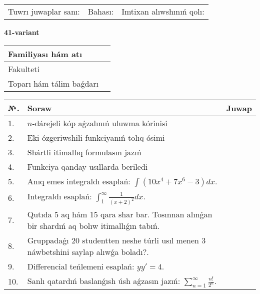 \documentclass{article}
\begin{document}
\vspace{1cm}

\begin{tabular}{ c c c }
Tuwrı juwaplar sanı: \underline{\hspace{2cm}} & Bahası: \underline{\hspace{2cm}} & Imtixan alıwshınıń qolı: \underline{\hspace{2cm}} \\
\end{tabular}

\newpage

\begin{center}\textbf{41-variant}\end{center}

\bgroup
\def\arraystretch{1.5}
\begin{tabular}{ |m{6cm}|m{10cm}| }
  \hline
  Familiyası hám atı & \\
  \hline
  Fakulteti &\\
  \hline
  Toparı hám tálim baǵdarı & \\
  \hline
\end{tabular}
\egroup

\vspace{0.5cm}

\bgroup
\def\arraystretch{2}
\begin{tabular}{ |l|m{8cm}|m{7cm}| }
  \hline
  №. & Soraw & Juwap \\
  \hline
  1. & $n$-dárejeli kóp aǵzalınıń uluwma kórinisi &  \\
  \hline
  2. & Eki ózgeriwshili funkciyanıń tolıq ósimi &  \\
  \hline
  3. & Shártli itimallıq formulasın jazıń &  \\
  \hline
  4. & Funkciya qanday usıllarda beriledi &  \\
  \hline
  5. & Anıq emes integraldı esaplań: $\displaystyle\int \left( 10x^{4} + 7x^{6} - 3 \right)dx$. &  \\
  \hline
  6. & Integraldı esaplań: $\displaystyle\int_{1}^{\infty}{\frac{1}{\left( x + 2 \right)^{2}}dx }$. &  \\
  \hline
  7. & Qutıda 5 aq hám 15 qara shar bar. Tosınnan alınǵan bir shardıń aq bolıw itimallıǵın tabıń. &  \\
  \hline
  8. & Gruppadaǵı 20 studentten neshe túrli usıl menen 3 náwbetshini saylap alıwǵa boladı?. &  \\
  \hline
  9. & Differencial teńlemeni esaplań: $yy'= 4$. &  \\
  \hline
  10. & Sanlı qatardıń baslanǵısh úsh aǵzasın jazıń: $\displaystyle\sum_{n = 1}^{\infty}\frac{n!}{2^{n}}$. &  \\
  \hline
\end{tabular}
\egroup
\end{document}
